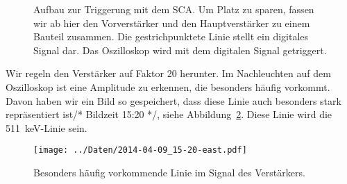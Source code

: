 \begin{figure}[htbp]
    \centering
    \caption{%
        Aufbau zur Triggerung mit dem SCA. Um Platz zu sparen, fassen wir ab
        hier den Vorverstärker und den Hauptverstärker zu einem Bauteil
        zusammen. Die gestrichpunktete Linie stellt ein digitales Signal dar.
        Das Oszilloskop wird mit dem digitalen Signal getriggert.
    }
    \label{fig:aufbau:sca_trigger}
\end{figure}

Wir regeln den Verstärker auf Faktor 20 herunter. Im Nachleuchten auf dem
Oszilloskop ist eine Amplitude zu erkennen, die besonders häufig vorkommt. Davon
haben wir ein Bild so gespeichert, dass diese Linie auch besonders stark
repräsentiert ist/* Bildzeit 15:20 */, siehe Abbildung~\ref{fig:511}. Diese
Linie wird die \SI{511}{\kilo\electronvolt}-Linie sein.

\begin{figure}[htbp]
    \centering
    \texttt{[image: ../Daten/2014-04-09\_15-20-east.pdf]}
    \caption{%
        Besonders häufig vorkommende Linie im Signal des Verstärkers.
    }
    \label{fig:511}
\end{figure}

